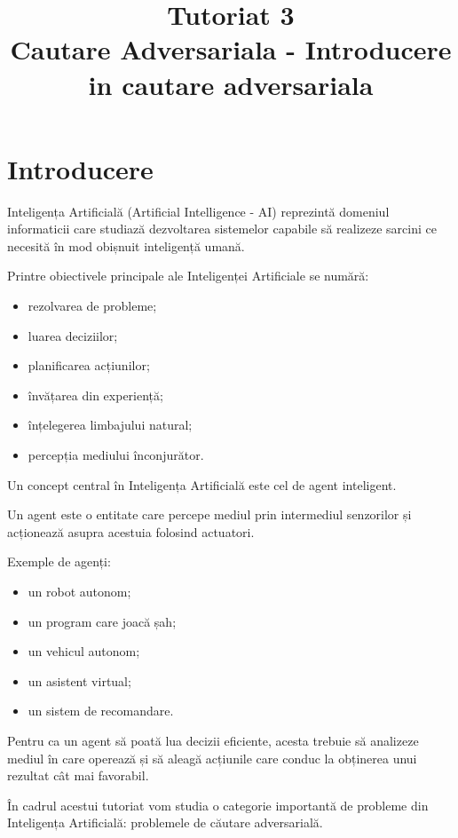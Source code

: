 \documentclass[12pt,a4paper]{article}
\title{Tutoriat 3\\Cautare Adversariala - Introducere in cautare adversariala}
\author{}
\date{}
\begin{document}
\maketitle


\section{Introducere}

Inteligența Artificială (Artificial Intelligence - AI) reprezintă domeniul informaticii care studiază dezvoltarea sistemelor capabile să realizeze sarcini ce necesită în mod obișnuit inteligență umană.

Printre obiectivele principale ale Inteligenței Artificiale se numără:

\begin{itemize}
\item rezolvarea de probleme;
\item luarea deciziilor;
\item planificarea acțiunilor;
\item învățarea din experiență;
\item înțelegerea limbajului natural;
\item percepția mediului înconjurător.
\end{itemize}

Un concept central în Inteligența Artificială este cel de agent inteligent.

Un agent este o entitate care percepe mediul prin intermediul senzorilor și acționează asupra acestuia folosind actuatori.

Exemple de agenți:

\begin{itemize}
\item un robot autonom;
\item un program care joacă șah;
\item un vehicul autonom;
\item un asistent virtual;
\item un sistem de recomandare.
\end{itemize}

Pentru ca un agent să poată lua decizii eficiente, acesta trebuie să analizeze mediul în care operează și să aleagă acțiunile care conduc la obținerea unui rezultat cât mai favorabil.

În cadrul acestui tutoriat vom studia o categorie importantă de probleme din Inteligența Artificială: problemele de căutare adversarială.
\end{document}
